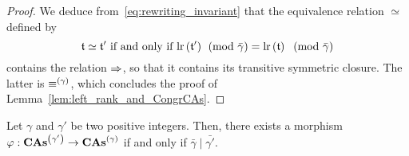 \begin{proof}
    We deduce from~\eqref{eq:rewriting_invariant} that the equivalence
    relation $\simeq$ defined by
    \begin{equation}
        \mathfrak{t} \simeq \mathfrak{t}' \mbox{ if and only if }
        \mathrm{lr}\left(\mathfrak{t}'\right) \pmod{\bar{\gamma}} =
        \mathrm{lr}\left(\mathfrak{t}\right) \, \pmod{\bar{\gamma}}
    \end{equation}
    contains the relation $\operatorname{\Rightarrow}$, so that it contains its
    transitive symmetric closure. The latter is $\operatorname{\equiv}^{(\gamma)}$,
    which concludes the proof of Lemma~\ref{lem:left_rank_and_CongrCAs}.
\end{proof}
\medbreak

\begin{Proposition} \label{prop:division_CAs}
    Let $\gamma$ and $\gamma'$ be two positive integers. Then, there
    exists a morphism $\varphi:\mathbf{CAs}^{\left(\gamma'\right)} \to \mathbf{CAs}^{\left(\gamma\right)}$ if and
    only if $\bar{\gamma} \mid \bar{\gamma'}$.
\end{Proposition}
